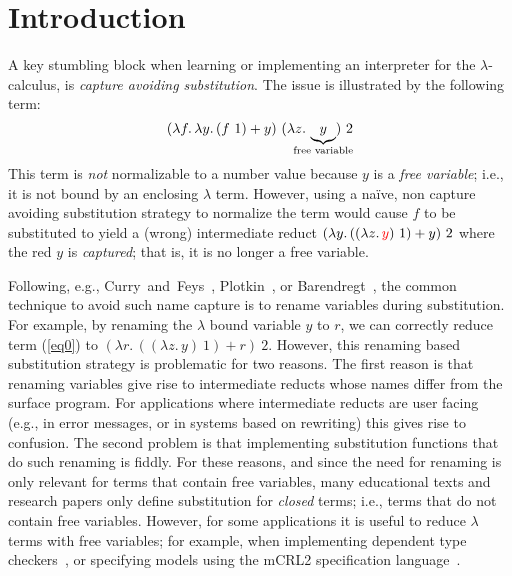 \section{Introduction}


A key stumbling block when learning or implementing an interpreter for the $\lambda$-calculus, is \emph{capture avoiding substitution}.
The issue is illustrated by the following term:
\begin{equation}
  (\lambda f .\, \lambda y .\, (f\ 1) + y)\ (\lambda z .\, \underbrace{y}_{\mathclap{\text{free variable}}})\ 2
  \label{eq0}
\end{equation}
This term is \emph{not} normalizable to a number value because $y$ is a \emph{free variable}; i.e., it is not bound by an enclosing $\lambda$ term.
However, using a na\"{i}ve, non capture avoiding substitution strategy to normalize the term would cause $f$ to be substituted to yield a (wrong) intermediate reduct $(\lambda y .\, ((\lambda z .\, {\color{red} y})\ 1) + y)\ 2$ where the {\color{red} red $y$} is \emph{captured}; that is, it is no longer a free variable.

Following, e.g., Curry~and~Feys~\cite{curry1958combinatory}, Plotkin~\cite{Plotkin75}, or Barendregt~\cite{DBLP:books/daglib/0067558}, the common technique to avoid such name capture is to rename variables during substitution.
For example, by renaming the $\lambda$ bound variable $y$ to $r$, we can correctly reduce term (\ref{eq0}) to $(\lambda r .\, ((\lambda z .\, y)\ 1) + r)\ 2$.
However, this renaming based substitution strategy is problematic for two reasons.
The first reason is that renaming variables give rise to intermediate reducts whose names differ from the surface program.
For applications where intermediate reducts are user facing (e.g., in error messages, or in systems based on rewriting) this gives rise to confusion.
The second problem is that implementing substitution functions that do such renaming is fiddly.
For these reasons, and since the need for renaming is only relevant for terms that contain free variables, many educational texts and research papers only define substitution for \emph{closed} terms; i.e., terms that do not contain free variables.
However, for some applications it is useful to reduce $\lambda$ terms with free variables; for example, when implementing dependent type checkers~\cite{Pareto1995ALF}, or specifying models using the mCRL2 specification language~\cite{DBLP:books/mit/GrooteM2014}.

